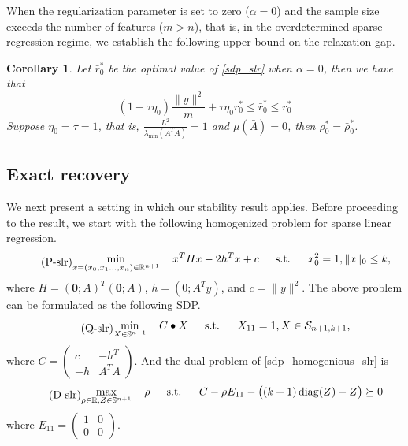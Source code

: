 \documentclass[11pt]{amsart}
\newcommand{\Szero}[2]{\ensuremath{\mathcal{S}_{#1,#2}}}
\theoremstyle{plain}
\newtheorem{cor}{Corollary}[section]
\theoremstyle{definition}
\theoremstyle{remark}
\newcommand{\RR}{\mathbb{R}}
\renewcommand{\SS}{{\mathbb{S}}}
\newcommand{\vzero}{\mathbf{0}}
\newcommand{\st}{\text{\, s.t.\, }}
\DeclareMathOperator{\diag}{diag}
\begin{document}
	When the regularization parameter is set to zero (\(\alpha=0\)) and the sample size exceeds the number of features (\(m>n\)), that is, in the overdetermined sparse regression regime, we establish the following upper bound on the relaxation gap.
	
	\begin{cor}
		Let $\bar r^*_0$ be the optimal value of \eqref{sdp_slr} when $\alpha=0$, then we have that
		\begin{equation}
			(1-\tau\eta_0) \frac{\|y\|^2}{m} + \tau\eta_0 r^*_0  \leq \bar r^*_0 \leq r^*_0
		\end{equation}
		Suppose $\eta_0=\tau=1$, that is, $\frac{L^2}{\lambda_{\min}(A^TA)}=1$ and $\mu(\bar A) = 0$, then $\rho^*_0 = \bar\rho^*_0$.
	\end{cor}
	
	\subsection{Exact recovery}
	We next present a setting in which our stability result applies. Before proceeding to the result, we start with the following homogenized problem for sparse linear regression.
	\begin{equation}\label{homogenious_slr}
		\tag{P-slr}
		\begin{aligned}
			\min_{x=(x_0,x_1\dots,x_n)\in \RR^{n+1}} \quad  x^T H x - 2h^Tx + c
			\quad\st\quad
			x_0^2 = 1, \|x\|_0 \leq k,
		\end{aligned}
	\end{equation}
	where \(H = (\vzero; A)^T(\vzero; A)\), \(h =(0; A^Ty)\), and \(c = \|y\|^2\). The above problem can be formulated as the following SDP.
	\begin{equation}\label{sdp_homogenious_slr}
		\tag{Q-slr}
		\begin{aligned}
			\min_{X \in \SS^{n+1}} \quad   C \bullet X
			\quad\st\quad
			X_{11} = 1, X \in \Szero{n+1}{k+1},
		\end{aligned}
	\end{equation}
	where \(C = \left(\begin{smallmatrix}
		c & -h^T\\
		-h & A^TA
	\end{smallmatrix}\right)
	\). And the dual problem of \eqref{sdp_homogenious_slr} is
	\begin{equation}\label{sdp_homogenious_slr_dual}
		\tag{D-slr}
		\begin{aligned}
			\max_{\rho\in\RR,Z\in\SS^{n+1}} \quad   \rho 
			\quad\st\quad
			C - \rho E_{11} - \big((k+1)\diag(Z)-Z\big) \succeq 0
		\end{aligned}
	\end{equation}
	where \(E_{11} = \left(\begin{smallmatrix}
		1 & 0\\
		0 & 0
	\end{smallmatrix}\right) \).
	
\end{document}
